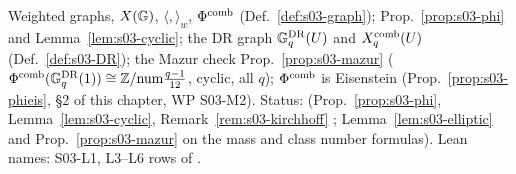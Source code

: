 \begin{interface}\label{if:s03-graph}
Weighted graphs, $X(\mathbb{G})$, $\langle,\rangle_w$, $\Phi^{\mathrm{comb}}$ (Def.~\ref{def:s03-graph}); Prop.~\ref{prop:s03-phi} and
Lemma~\ref{lem:s03-cyclic}; the DR graph $\mathbb{G}^{\mathrm{DR}}_q(U)$ and $X^{\mathrm{comb}}_q(U)$ (Def.~\ref{def:s03-DR}); the Mazur check
Prop.~\ref{prop:s03-mazur} ($\Phi^{\mathrm{comb}}(\mathbb{G}^{\mathrm{DR}}_q(1))\cong\mathbb{Z}/\mathrm{num}\frac{q-1}{12}$, cyclic, all $q$); $\Phi^{\mathrm{comb}}$ is Eisenstein
(Prop.~\ref{prop:s03-phieis}, \S2 of this chapter, WP S03-M2). Status: \stpmc{} (Prop.~\ref{prop:s03-phi}, Lemma~\ref{lem:s03-cyclic},
Remark~\ref{rem:s03-kirchhoff} \stproved; Lemma~\ref{lem:s03-elliptic} and Prop.~\ref{prop:s03-mazur} \stpmc{} on the mass and class number
formulas). Lean names: S03-L1, L3--L6 rows of .
\end{interface}
